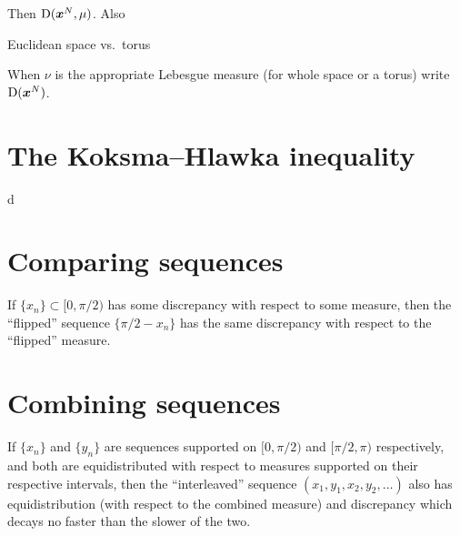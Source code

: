 Then $\operatorname{D}({\boldsymbol x}^N, \mu)$. Also 

Euclidean space vs.~torus

When $\nu$ is the appropriate Lebesgue measure (for whole space or a torus) 
write $\operatorname{D}({\boldsymbol x}^N)$. 





\section{The Koksma--Hlawka inequality}

d





\section{Comparing sequences}

If $\{x_n\}\subset [0,\pi/2)$ has some discrepancy with respect to some 
measure, then the ``flipped'' sequence $\{\pi/2-x_n\}$ has the same discrepancy 
with respect to the ``flipped'' measure. 





\section{Combining sequences}

If $\{x_n\}$ and $\{y_n\}$ are sequences supported on $[0,\pi/2)$ and 
$[\pi/2,\pi)$ respectively, and both are equidistributed with respect to 
measures supported on their respective intervals, then the ``interleaved'' 
sequence $(x_1,y_1,x_2,y_2,\dots)$ also has equidistribution (with respect to 
the combined measure) and discrepancy which decays no faster than the slower of 
the two. 
